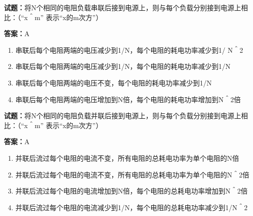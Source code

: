 \documentclass{ctexbook}
\begin{document}




\vspace{1em}

\textbf{试题：}将N个相同的电阻负载串联后接到电源上，则与每个负载分别接到电源上相比：（“x＾m”
表示“x的m次方”） 

\textbf{答案：}A 

\begin{enumerate}[leftmargin=3em]
  \item 串联后每个电阻两端的电压减少到1/N，每个电阻的耗电功率减少到1/ N＾2 

  \item 串联后每个电阻两端的电压减少到1/N，每个电阻的耗电功率减少到1/N 

  \item 串联后每个电阻两端的电压不变，每个电阻的耗电功率减少到1/N 

  \item 串联后每个电阻两端的电压增加到N倍，每个电阻的耗电功率增加到N＾2倍 

\end{enumerate}





\vspace{1em}

\textbf{试题：}将N个相同的电阻负载并联后接到电源上，则与每个负载分别接到电源上相比：（“x＾m”
表示“x的m次方”） 

\textbf{答案：}A 

\begin{enumerate}[leftmargin=3em]
  \item 并联后流过每个电阻的电流不变，所有电阻的总耗电功率为单个电阻的N倍 


  \item 并联后流过每个电阻的电流不变，所有电阻的总耗电功率为单个电阻的N＾2倍 

  \item 并联后流过每个电阻的电流增加到N倍，每个电阻的总耗电功率增加到N＾2倍 

  \item 并联后流过每个电阻的电流减少到1/N，每个电阻的总耗电功率减少到1/N＾2 

\end{enumerate}


\end{document}
